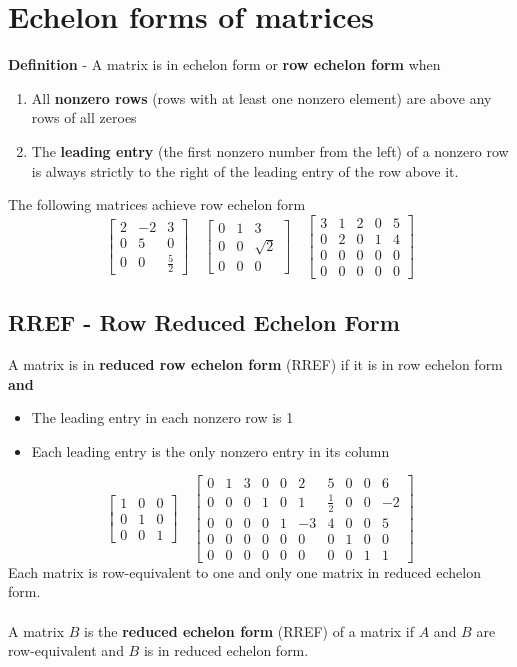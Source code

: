 \section{Echelon forms of matrices}
\textbf{Definition} - A matrix is in echelon form or \textbf{row echelon form} when
\begin{enumerate}
  \item All \textbf{nonzero rows} (rows with at least one nonzero element) are above any rows of all zeroes
  \item The \textbf{leading entry} (the first nonzero number from the left) of a nonzero row is always strictly to the right of the leading entry of the row above it.
\end{enumerate}
The following matrices achieve row echelon form
\[
  \begin{bmatrix}
    2 & -2 & 3 \\
    0 & 5 & 0 \\
    0 & 0 & \frac{5}{2}
  \end{bmatrix} \quad
  \begin{bmatrix}
    0 & 1 & 3 \\
    0 & 0 & \sqrt{2} \\
    0 & 0 & 0
  \end{bmatrix} \quad
  \begin{bmatrix}
    3 & 1 & 2 & 0 & 5 \\
    0 & 2 & 0 & 1 & 4 \\
    0 & 0 & 0 & 0 & 0 \\
    0 & 0 & 0 & 0 & 0
  \end{bmatrix}
\]
\subsection{RREF - Row Reduced Echelon Form}
A matrix is in \textbf{reduced row echelon form} (RREF) if it is in row echelon form \textbf{and}
\begin{itemize}
  \item The leading entry in each nonzero row is 1
  \item Each leading entry is the only nonzero entry in its column
\end{itemize}
\[
  \begin{bmatrix}
    1 & 0 & 0 \\
    0 & 1 & 0 \\
    0 & 0 & 1
  \end{bmatrix} \quad
  \begin{bmatrix}
    0 & 1 & 3 & 0 & 0 & 2 & 5 & 0 & 0 & 6 \\
    0 & 0 & 0 & 1 & 0 & 1 & \frac{1}{2} & 0 & 0 & -2 \\
    0 & 0 & 0 & 0 & 1 & -3 & 4 & 0 & 0 & 5 \\
    0 & 0 & 0 & 0 & 0 & 0 & 0 & 1 & 0 & 0 \\
    0 & 0 & 0 & 0 & 0 & 0 & 0 & 0 & 1 & 1
  \end{bmatrix}
\]
Each matrix is row-equivalent to one and only one matrix in reduced echelon form. \\\\ 
A matrix $B$ is the \textbf{reduced echelon form} (RREF) of a matrix if $A$ and $B$ are row-equivalent and $B$ is in reduced echelon form.
